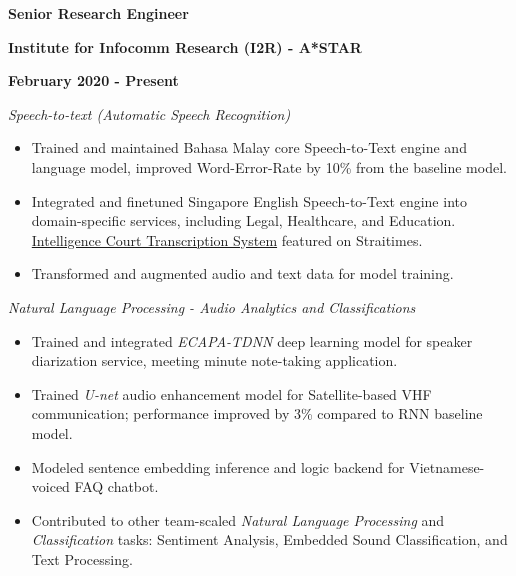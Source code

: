 \documentclass[10pt]{article}
\begin{document}
        \begin{multicols}{3}
            \begin{flushleft}
                \textbf{Senior Research Engineer}
            \end{flushleft}

            \columnbreak

            \begin{center}
                \textbf{Institute for Infocomm Research (I2R) - A*STAR}
            \end{center}

            \columnbreak

            \begin{flushright}
                \textbf{February 2020 - Present}
            \end{flushright}
        \end{multicols}

        \vspace{-5mm}
        \emph{Speech-to-text (Automatic Speech Recognition)}
        \vspace{-2.5mm}
        \begin{itemize}[noitemsep]
            \item Trained and maintained Bahasa Malay core Speech-to-Text engine and language model, improved Word-Error-Rate by 10\% from the baseline model.
            \item Integrated and finetuned Singapore English Speech-to-Text engine into domain-specific services, including Legal, Healthcare, and Education. \href{https://www.straitstimes.com/singapore/courts-crime/state-courts-to-use-system-that-instantly-transcribes-court-proceedings}{Intelligence Court Transcription System} featured on Straitimes.
            \item Transformed and augmented audio and text data for model training.
        \end{itemize}

        \emph{Natural Language Processing - Audio Analytics and Classifications}
        \vspace{-2.5mm}
        \begin{itemize}[noitemsep]
            \item Trained and integrated \emph{ECAPA-TDNN} deep learning model for speaker diarization service, meeting minute note-taking application.
            \item Trained \emph{U-net} audio enhancement model for Satellite-based VHF communication; performance improved by 3\% compared to RNN baseline model.
            \item Modeled sentence embedding inference and logic backend for Vietnamese-voiced FAQ chatbot.
            \item Contributed to other team-scaled \emph{Natural Language Processing} and \emph{Classification} tasks: Sentiment Analysis, Embedded Sound Classification, and Text Processing.
        \end{itemize}
\end{document}
